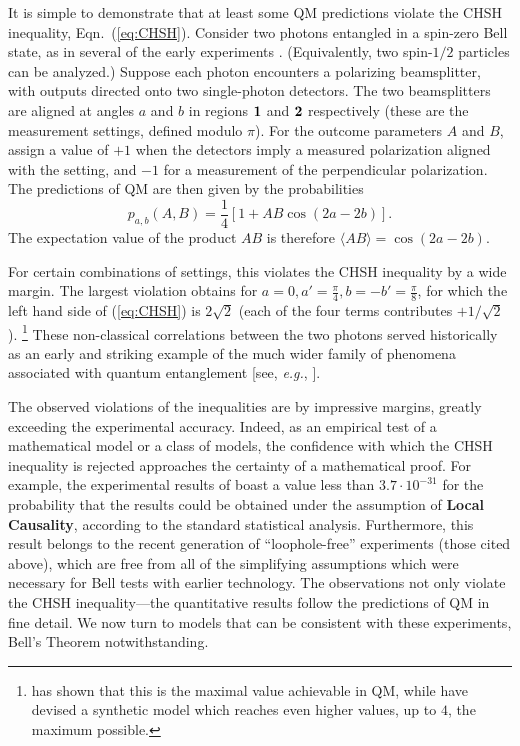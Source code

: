 \documentclass[onecolumn, nofootinbib, 12pt]{revtex4-1}
\begin{document}
It is simple to demonstrate that at least some QM predictions violate the CHSH inequality, Eqn.~(\ref{eq:CHSH}).  Consider two photons entangled in a spin-zero Bell state, as in several of the early experiments \cite{clauser1978,aspect1981}.  (Equivalently, two spin-$1/2$ particles can be analyzed.)  Suppose each photon encounters a polarizing beamsplitter, with outputs directed onto two single-photon detectors.  The two beamsplitters are aligned at angles $a$ and $b$ in regions $\bf{1}$ and $\bf{2}$ respectively (these are the measurement settings, defined modulo $\pi$).  For the outcome parameters $A$ and $B$, assign a value of $+1$ when the detectors imply a measured polarization aligned with the setting, and $-1$ for a measurement of the perpendicular polarization.  The predictions of QM are then given by the probabilities
\begin{equation}
\label{eq:QMsinglet}
p_{a,b}(A,B) = \frac{1}{4} \left[ 1 + A B \cos(2a-2b) \right].
\end{equation}
The expectation value of the product $AB$ is therefore $\langle A B \rangle=\cos(2a-2b)$.

For certain combinations of settings, this violates the CHSH inequality by a wide margin. The largest violation obtains for $a=0, a'=\frac{\pi}{4}, b=-b'=\frac{\pi}{8}$, for which the left hand side of (\ref{eq:CHSH}) is $2\sqrt{2}$ (each of the four terms contributes $+1/\sqrt{2}$).%
\footnote{\label{fn:Tsirelson}%
\textcite{cirelson1980} has shown that this is the maximal value achievable in QM, while \textcite{popescu1994} have devised a synthetic model which reaches even higher values, up to $4$, the maximum possible.}
These non-classical correlations between the two photons served historically as an early and striking example of the much wider family of phenomena associated with quantum entanglement [see, \emph{e.g.}, \textcite{brunner2014,streltsov2017}].

The observed violations of the inequalities are by impressive margins, greatly exceeding the experimental accuracy.  Indeed, as an empirical test of a mathematical model or a class of models, the confidence with which the CHSH inequality is rejected approaches the certainty of a mathematical proof.  For example, the experimental results of \textcite{giustina2015} boast a value less than $3.7 \cdot 10^{-31}$ for the probability that the results could be obtained under the assumption of {\bf Local Causality}, according to the standard statistical analysis.  Furthermore, this result belongs to the recent generation of ``loophole-free'' experiments (those cited above), which are free from all of the simplifying assumptions which were necessary for Bell tests with earlier technology.  The observations not only violate the CHSH inequality---the quantitative results follow the predictions of QM in fine detail.  We now turn to models that can be consistent with these experiments, Bell's Theorem notwithstanding.
\end{document}

